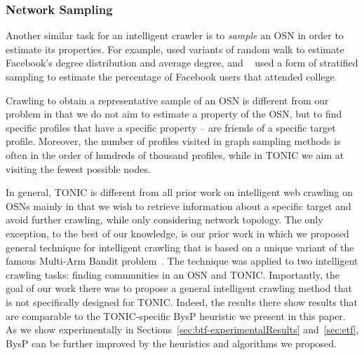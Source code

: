 \documentclass[prodmode,acmtecs]{acmsmall} %
\begin{document}
%


\subsubsection{Network Sampling}

Another similar task for an intelligent crawler is to {\em sample} an OSN in order to estimate its properties. 
For example,  used variants of random walk to estimate Facebook's degree distribution and average degree, and ~ used a form of stratified sampling to estimate the percentage of Facebook users that attended college. 

Crawling to obtain a representative sample of an OSN is different from our problem in that we do not aim to estimate a property of the OSN, but to find specific profiles that have a specific property -- are friends of a specific target profile. Moreover, the number of profiles visited in graph sampling methods is often in the order of hundreds of thousand profiles, while in  TONIC we aim at visiting the fewest possible nodes. 


In general, TONIC is different from all prior work on intelligent web crawling on OSNs mainly in that we wish to retrieve information about a specific target and avoid further crawling, while only considering network topology. The only exception, to the best of our knowledge, is our prior work in which we proposed general technique for intelligent crawling that is based on a unique variant of the famous Multi-Arm Bandit problem~\cite{bnaya2013social-journal}. The technique was applied to two intelligent crawling tasks: finding communities in an OSN and TONIC. Importantly, the goal of our work there was to propose a general intelligent crawling method that is not specifically designed for TONIC. Indeed, the results there show results that are comparable to the TONIC-specific BysP heuristic we present in this paper. As we show experimentally in Sections~\ref{sec:btf-experimentalResults} and~\ref{sec:etf}, BysP can be further improved by the heuristics and algorithms we proposed. 
\end{document}
